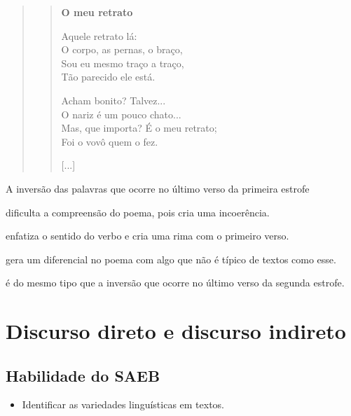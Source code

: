 \begin{quote}
\begin{verse}
\textbf{O meu retrato}

Aquele retrato lá:\\
O corpo, as pernas, o braço,\\
Sou eu mesmo traço a traço,\\
Tão parecido ele está.

Acham bonito? Talvez...\\
O nariz é um pouco chato...\\
Mas, que importa? É o meu retrato;\\
Foi o vovô quem o fez.

{[}...{]}
\end{verse}
\end{quote}


A inversão das palavras que ocorre no último verso da primeira estrofe

\begin{escolha}[itemsep=-5pt]
\item dificulta a compreensão do poema, pois cria uma incoerência.

\item enfatiza o sentido do verbo e cria uma rima com o primeiro verso.

\item gera um diferencial no poema com algo que não é típico de textos como esse.

\item é do mesmo tipo que a inversão que ocorre no último verso da segunda estrofe.
\end{escolha}

\chapter{Discurso direto e discurso indireto}

\section{Habilidade do SAEB}

\begin{itemize}
  \item Identificar as variedades linguísticas em textos.
\end{itemize}

